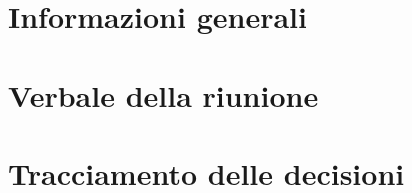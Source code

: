 \documentclass[a4paper, oneside, openany, dvipsnames, table]{article}
\begin{document}
\copertina{}



\newpage
\tableofcontents

\newpage
\section{Informazioni generali}\label{sec:informazioni-generali}


\newpage
\section{Verbale della riunione}\label{sec:verbale-della-riunione}


\newpage
\section{Tracciamento delle decisioni}\label{sec:tracciamento-delle-decisioni}

\end{document}
